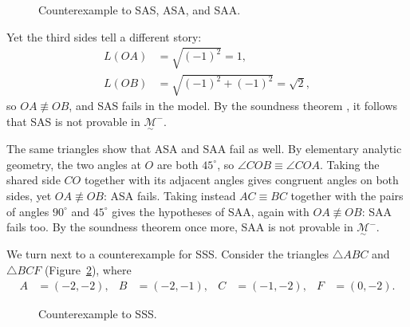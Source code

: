 \documentclass[11pt,a4paper]{article}
\theoremstyle{definition}
\theoremstyle{remark}
\numberwithin{equation}{section}
\newcommand{\MG}{\underset{\sim}{\mathcal{M}}} %
\begin{document}
\begin{figure}[ht!]
\centering
{}%
\caption{Counterexample to SAS, ASA, and SAA.}
\label{PEN_Hff}
\end{figure}

Yet the third sides tell a different story:
\begin{align*}
L(OA)&=\sqrt{(-1)^2}=1,\\
L(OB)&=\sqrt{(-1)^2+(-1)^2}=\sqrt2,
\end{align*}
so $OA\not\equiv OB$, and SAS fails in the model. By the soundness theorem
\cite[Sec.~2.5, pp.~131--134]{Enderton2001}, it follows that SAS is not provable in $\MG^{-}$.

The same triangles show that ASA and SAA fail as well. By elementary analytic geometry, the two
angles at $O$ are both $45^\circ$, so $\angle COB\equiv\angle COA$. Taking the shared side $CO$
together with its adjacent angles gives congruent angles on both sides, yet $OA\not\equiv OB$:
ASA fails. Taking instead $AC\equiv BC$ together with the pairs of angles $90^\circ$ and
$45^\circ$ gives the hypotheses of SAA, again with $OA\not\equiv OB$: SAA fails too. By the
soundness theorem once more, SAA is not provable in $\MG^{-}$.

We turn next to a counterexample for SSS. Consider the triangles $\triangle ABC$ and
$\triangle BCF$ (Figure~\ref{PEN_H_LLLf}), where
\begin{align*}
A&=(-2,-2),&
B&=(-2,-1),&
C&=(-1,-2),&
F&=(0,-2).
\end{align*}

\begin{figure}[ht!]
\centering
{}
\caption{Counterexample to SSS.}
\label{PEN_H_LLLf}
\end{figure}
\end{document}
